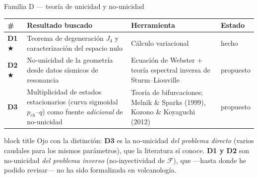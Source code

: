 \documentclass[aspectratio=169,10pt,t]{beamer}
\newcommand{\ideageo}{\textcolor{magma}{$\bigstar$}}
\newcommand{\mensaje}[1]{%
  \vfill
  \begin{beamercolorbox}[wd=\linewidth,sep=0.4em,rounded=true]{block title}
  \footnotesize #1
  \end{beamercolorbox}}
\begin{document}
\begin{frame}{Familia D — teoría de unicidad y no-unicidad}
\small
\begin{tabular}{@{}p{}p{}p{}p{}@{}}
\toprule
\# & \textbf{Resultado buscado} & \textbf{Herramienta} & \textbf{Estado} \\
\midrule
\textbf{D1}\,\ideageo & Teorema de degeneración $J_4$ y caracterización del
espacio nulo & Cálculo variacional & \alert{hecho} \\[0.4em]
\textbf{D2}\,\ideageo & No-unicidad de la geometría desde datos sísmicos de
resonancia & Ecuación de Webster $+$ teoría espectral inversa de
Sturm–Liouville & propuesto \\[0.4em]
\textbf{D3} & Multiplicidad de estados estacionarios (curva sigmoidal
$p_{ch}$–$q$) como fuente \emph{adicional} de no-unicidad &
Teoría de bifurcaciones; Melnik \& Sparks (1999), Kozono \& Koyaguchi (2012) &
propuesto \\
\bottomrule
\end{tabular}

\mensaje{Ojo con la distinción: \textbf{D3} es la no-unicidad \emph{del problema
directo} (varios caudales para los mismos parámetros), que la literatura sí
conoce. \textbf{D1 y D2} son no-unicidad \emph{del problema inverso}
(no-inyectividad de $\mathcal{F}$), que —hasta donde he podido revisar— no ha
sido formalizada en volcanología.}
\end{frame}
\end{document}
